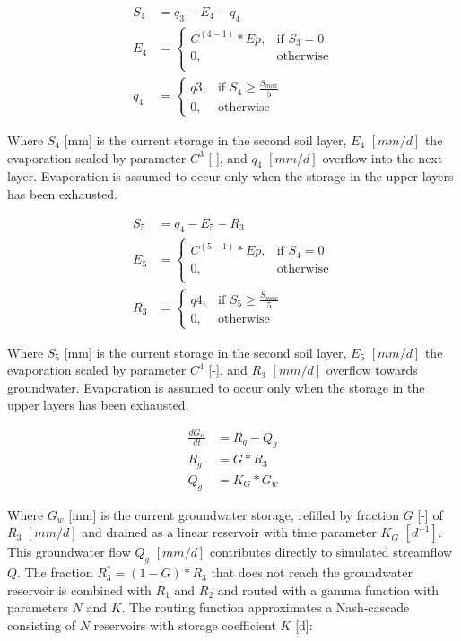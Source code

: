 \begin{align}
	S_4 &= q_3 - E_4 - q_4\\
	E_4 &= 
		\begin{cases}
		C^{(4-1)}*Ep , & \text{if } S_3 = 0\\
		0, & \text{otherwise}\\
	\end{cases}\\
	q_4 &= 
	\begin{cases}
		q3, & \text{if } S_4 \geq \frac{S_{max}}{5} \\
		0, & \text{otherwise}
	\end{cases}
\end{align}

Where $S_4$ [mm] is the current storage in the second soil layer, $E_4$ $[mm/d]$ the evaporation scaled by parameter $C^3$ [-], and $q_4$ $[mm/d]$ overflow into the next layer. Evaporation is assumed to occur only when the storage in the upper layers has been exhausted.

\begin{align}
	S_5 &= q_4 - E_5 - R_3\\
	E_5 &= 
		\begin{cases}
		C^{(5-1)}*Ep , & \text{if } S_4 = 0\\
		0, & \text{otherwise}\\
	\end{cases}\\
	R_3 &= 
	\begin{cases}
		q4, & \text{if } S_5 \geq \frac{S_{max}}{5} \\
		0, & \text{otherwise}
	\end{cases}
\end{align}

Where $S_5$ [mm] is the current storage in the second soil layer, $E_5$ $[mm/d]$ the evaporation scaled by parameter $C^4$ [-], and $R_3$ $[mm/d]$ overflow towards groundwater. Evaporation is assumed to occur only when the storage in the upper layers has been exhausted.

\begin{align}
	\frac{dG_w}{dt} &= R_g -Q_g\\
	R_g &= G*R_3\\
	Q_g &= K_G*G_w
\end{align}

Where $ G_w$ [mm] is the current groundwater storage, refilled by fraction $G$ [-] of $R_3$ $[mm/d]$ and drained as a linear reservoir with time parameter $K_G$ $[d^{-1}]$. This groundwater flow $Q_g$   $[mm/d]$ contributes directly to simulated streamflow $Q$. The fraction $R_3^* = (1-G)*R_3$ that does not reach the groundwater reservoir is combined with $R_1$ and $R_2$ and routed with a gamma function with parameters $N$ and $K$. The routing function approximates a Nash-cascade consisting of $N$ reservoirs with storage coefficient $K$ [d]: 

